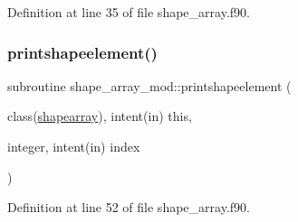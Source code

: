Definition at line 35 of file shape\+\_\+array.\+f90.

\mbox{\label{namespaceshape__array__mod_a21045b79e1718e47bd933ce6181ee7fd}} 
\subsubsection{\texorpdfstring{printshapeelement()}{printshapeelement()}}
{\footnotesize\ttfamily subroutine shape\+\_\+array\+\_\+mod\+::printshapeelement (\begin{DoxyParamCaption}\item[{class(\mbox{\hyperlink{structshape__array__mod_1_1shapearray}{shapearray}}), intent(in)}]{this,  }\item[{integer, intent(in)}]{index }\end{DoxyParamCaption})\hspace{0.3cm}{\ttfamily [private]}}



Definition at line 52 of file shape\+\_\+array.\+f90.

